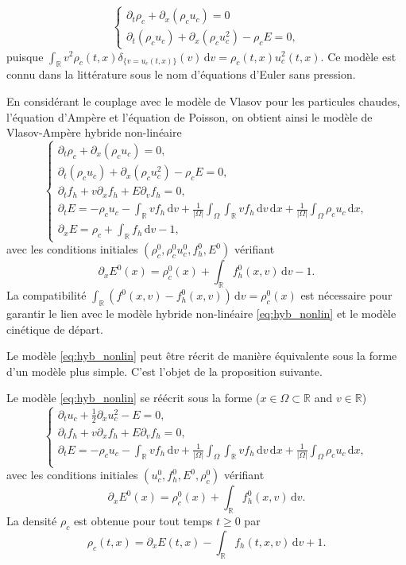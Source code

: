 $$
  \begin{cases}
    \partial_t \rho_c + \partial_x (\rho_cu_c) = 0 \\
    \partial_t (\rho_cu_c) + \partial_x (\rho_cu_c^2) - \rho_cE = 0,
  \end{cases}
$$
puisque $\int_{\mathbb{R}} v^2 \rho_c(t,x)\delta_{\{v=u_c(t,x)\}}(v) \,\mathrm{d}v = \rho_c(t,x) u_c^2 (t,x)$. Ce modèle est connu dans la littérature sous le nom d'équations d'Euler sans pression.

En considérant le couplage avec le modèle de Vlasov pour les particules chaudes, l'équation d'Ampère et l'équation de Poisson, on obtient ainsi le modèle de Vlasov-Ampère hybride non-linéaire
\begin{equation}
  \begin{cases}
    \partial_t \rho_c + \partial_x (\rho_cu_c) = 0, \\
    \partial_t (\rho_cu_c) + \partial_x (\rho_cu_c^2) - \rho_cE = 0, \\
    \partial_t f_h + v\partial_x f_h + E\partial_v f_h = 0, \\
    \partial_t E = -\rho_cu_c -\int_{\mathbb{R}} vf_h\,\mathrm{d}v+ \frac{1}{|\Omega|}\int_\Omega \int_{\mathbb{R}} vf_h\,\mathrm{d}v \,\mathrm{d}x+ \frac{1}{|\Omega|}\int_\Omega \rho_cu_c \,\mathrm{d}x, \\
    \partial_x E = \rho_c + \int_{\mathbb{R}} f_h\,\mathrm{d}v - 1, 
  \end{cases}
\label{eq:hyb_nonlin}
\end{equation}
avec les conditions initiales $(\rho^0_{c}, \rho^0_{c} u^0_{c}, f^0_{h}, E^0)$ vérifiant
$$
  \partial_x E^0(x) = \rho^0_{c}(x)+\int_{\mathbb{R}} f^0_{h}(x, v)\,\mathrm{d}v-1.
$$ 
La compatibilité $\int_{\mathbb{R}} (f^0(x, v) - f^0_h(x, v))\,\mathrm{d}v  = \rho^0_{c}(x)$ est nécessaire pour garantir le lien avec le modèle hybride non-linéaire \eqref{eq:hyb_nonlin} et le modèle cinétique de départ. 

Le modèle \eqref{eq:hyb_nonlin} peut être récrit de manière équivalente sous la forme d'un modèle plus simple. C'est l'objet de la proposition suivante.  
\begin{pro}
  Le modèle \eqref{eq:hyb_nonlin} se réécrit sous la forme ($x\in\Omega\subset \mathbb{R}$ and $v\in\mathbb{R}$)
  $$
    \begin{cases}
      \partial_t u_c + \frac{1}{2}\partial_x u_c^2 - E = 0, \\
      \partial_t f_h + v\partial_x f_h + E\partial_v f_h = 0, \\
      \partial_t E = -\rho_c u_c -\int_{\mathbb{R}} vf_h\,\mathrm{d}v+ \frac{1}{|\Omega|}\int_\Omega \int_{\mathbb{R}} vf_h\,\mathrm{d}v \,\mathrm{d}x+ \frac{1}{|\Omega|}\int_\Omega \rho_cu_c \,\mathrm{d}x, \\
      \label{eq:hyb_nonlin_red}
    \end{cases}
  $$
  avec les conditions initiales $(u^0_{c}, f^0_{h}, E^0, \rho_c^0)$ vérifiant
  $$
    \partial_x E^0(x) = \rho^0_{c}(x)+\int_{\mathbb{R}} f^0_{h}(x, v)\,\mathrm{d}v.
  $$
  La densité $\rho_c$ est obtenue pour tout temps $t\geq 0$ par  
  $$
    \rho_c(t, x) = \partial_x E(t, x) - \int_{\mathbb{R}} f_{h}(t, x, v)\,\mathrm{d}v + 1. 
  $$
\end{pro}

